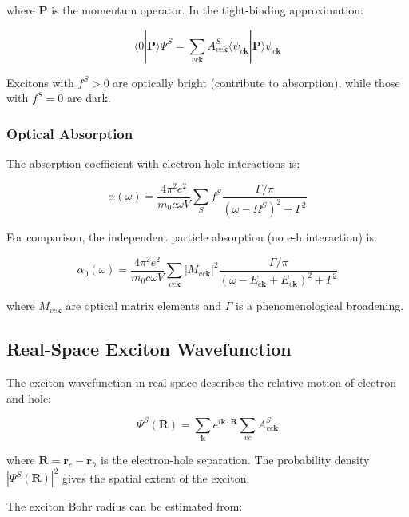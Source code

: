 \documentclass[11pt,a4paper]{article}
\newcommand{\braket}[2]{\langle #1|#2\rangle}
\begin{document}
where $\mathbf{P}$ is the momentum operator. In the tight-binding approximation:

\begin{equation}
\braket{0}{\mathbf{P}}{\Psi^S} = \sum_{vc\mathbf{k}} A^S_{vc\mathbf{k}} \braket{\psi_{v\mathbf{k}}}{\mathbf{P}}{\psi_{c\mathbf{k}}}
\end{equation}

Excitons with $f^S > 0$ are optically bright (contribute to absorption), while those with $f^S = 0$ are dark.

\subsubsection{Optical Absorption}

The absorption coefficient with electron-hole interactions is:

\begin{equation}
\alpha(\omega) = \frac{4\pi^2 e^2}{m_0 c \omega V} \sum_S f^S \frac{\Gamma/\pi}{(\omega - \Omega^S)^2 + \Gamma^2}
\end{equation}

For comparison, the independent particle absorption (no e-h interaction) is:

\begin{equation}
\alpha_0(\omega) = \frac{4\pi^2 e^2}{m_0 c \omega V} \sum_{vc\mathbf{k}} |M_{vc\mathbf{k}}|^2 \frac{\Gamma/\pi}{(\omega - E_{c\mathbf{k}} + E_{v\mathbf{k}})^2 + \Gamma^2}
\end{equation}

where $M_{vc\mathbf{k}}$ are optical matrix elements and $\Gamma$ is a phenomenological broadening.

\subsection{Real-Space Exciton Wavefunction}

The exciton wavefunction in real space describes the relative motion of electron and hole:

\begin{equation}
\Psi^S(\mathbf{R}) = \sum_{\mathbf{k}} e^{i\mathbf{k} \cdot \mathbf{R}} \sum_{vc} A^S_{vc\mathbf{k}}
\end{equation}

where $\mathbf{R} = \mathbf{r}_e - \mathbf{r}_h$ is the electron-hole separation. The probability density $|\Psi^S(\mathbf{R})|^2$ gives the spatial extent of the exciton.

The exciton Bohr radius can be estimated from:
\end{document}

